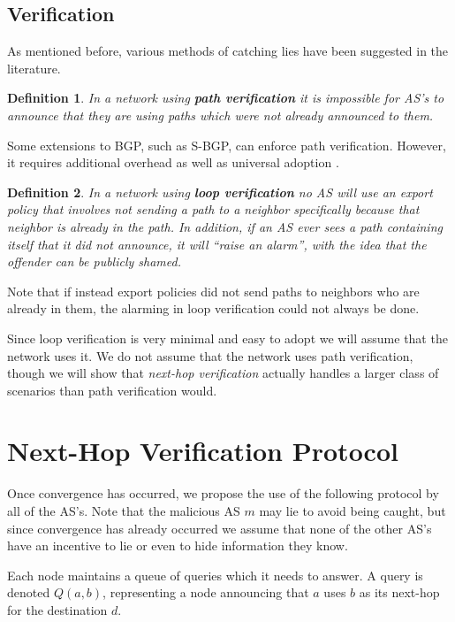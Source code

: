 \documentclass[12pt]{article}
\newtheorem{definition}{Definition}
\begin{document}
\subsection{Verification}
As mentioned before, various methods of catching lies have been suggested in the literature.

\begin{definition}
In a network using \textbf{path verification} it is impossible for AS's to announce that they are using paths which were not already announced to them.
\end{definition}

Some extensions to BGP, such as S-BGP, can enforce path verification. However, it requires additional overhead as well as universal adoption \cite{PartialDeploy}.

\begin{definition}
In a network using \textbf{loop verification} no AS will use an export policy that involves not sending a path to a neighbor specifically because that neighbor is already in the path. In addition, if an AS ever sees a path containing itself that it did not announce, it will ``raise an alarm'', with the idea that the offender can be publicly shamed.
\end{definition}

Note that if instead export policies did not send paths to neighbors who are already in them, the alarming in loop verification could not always be done.

Since loop verification is very minimal and easy to adopt we will assume that the network uses it.
We do not assume that the network uses path verification, though we will show that \emph{next-hop verification} actually handles a larger class of scenarios than path verification would.


\section{Next-Hop Verification Protocol}
Once convergence has occurred, we propose the use of the following protocol by all of the AS's. Note that the malicious AS $m$ may lie to avoid being caught, but since convergence has already occurred we assume that none of the other AS's have an incentive to lie or even to hide information they know.

  Each node maintains a queue of queries which it needs to answer.
  A query is denoted $Q(a,b)$, representing a node announcing that
  $a$ uses $b$ as its next-hop for the destination $d$.
\end{document}
